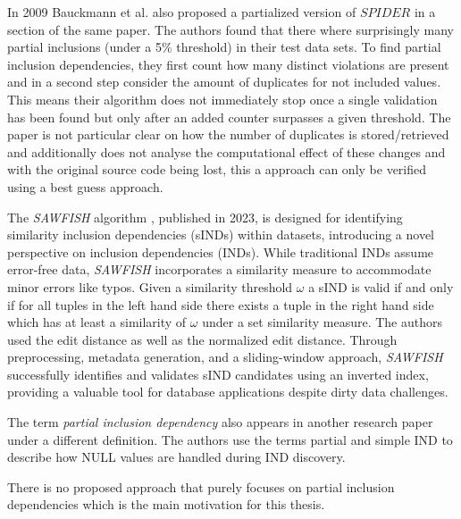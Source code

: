 In 2009 Bauckmann et al. also proposed a partialized version of $SPIDER$ in a section of the same paper. The authors found that there where surprisingly many partial inclusions (under a 5\% threshold) in their test data sets. To find partial inclusion dependencies, they first count how many distinct violations are present and in a second step consider the amount of duplicates for not included values. This means their algorithm does not immediately stop once a single validation has been found but only after an added counter surpasses a given threshold. The paper is not particular clear on how the number of duplicates is stored/retrieved and additionally does not analyse the computational effect of these changes and with the original source code being lost, this a approach can only be verified using a best guess approach.

The \textit{SAWFISH} algorithm \cite{kaminsky2023discovering}, published in 2023, is designed for identifying similarity inclusion dependencies (sINDs) within datasets, introducing a novel perspective on inclusion dependencies (INDs). While traditional INDs assume error-free data, \textit{SAWFISH} incorporates a similarity measure to accommodate minor errors like typos. Given a similarity threshold $\omega$ a sIND is valid if and only if for all tuples in the left hand side there exists a tuple in the right hand side which has at least a similarity of $\omega$ under a set similarity measure. The authors used the edit distance as well as the normalized edit distance. Through preprocessing, metadata generation, and a sliding-window approach, \textit{SAWFISH} successfully identifies and validates sIND candidates using an inverted index, providing a valuable tool for database applications despite dirty data challenges.

The term \textit{partial inclusion dependency} also appears in another research paper \cite{kohler2015inclusion} under a different definition. The authors use the terms partial and simple IND to describe how NULL values are handled during IND discovery.

There is no proposed approach that purely focuses on partial inclusion dependencies which is the main motivation for this thesis.

